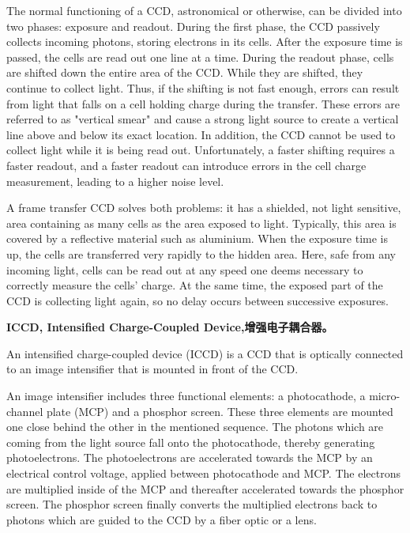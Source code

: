 The normal functioning of a CCD, astronomical or otherwise, can be divided into two phases: exposure and readout. During the first phase, the CCD passively collects incoming photons, storing electrons in its cells. After the exposure time is passed, the cells are read out one line at a time. During the readout phase, cells are shifted down the entire area of the CCD. While they are shifted, they continue to collect light. Thus, if the shifting is not fast enough, errors can result from light that falls on a cell holding charge during the transfer. These errors are referred to as "vertical smear" and cause a strong light source to create a vertical line above and below its exact location. In addition, the CCD cannot be used to collect light while it is being read out. Unfortunately, a faster shifting requires a faster readout, and a faster readout can introduce errors in the cell charge measurement, leading to a higher noise level.

A frame transfer CCD solves both problems: it has a shielded, not light sensitive, area containing as many cells as the area exposed to light. Typically, this area is covered by a reflective material such as aluminium. When the exposure time is up, the cells are transferred very rapidly to the hidden area. Here, safe from any incoming light, cells can be read out at any speed one deems necessary to correctly measure the cells' charge. At the same time, the exposed part of the CCD is collecting light again, so no delay occurs between successive exposures.

\textbf{ICCD, Intensified Charge-Coupled Device,增强电子耦合器。}

An intensified charge-coupled device (ICCD) is a CCD that is optically connected to an image intensifier that is mounted in front of the CCD.

An image intensifier includes three functional elements: a photocathode, a micro-channel plate (MCP) and a phosphor screen. These three elements are mounted one close behind the other in the mentioned sequence. The photons which are coming from the light source fall onto the photocathode, thereby generating photoelectrons. The photoelectrons are accelerated towards the MCP by an electrical control voltage, applied between photocathode and MCP. The electrons are multiplied inside of the MCP and thereafter accelerated towards the phosphor screen. The phosphor screen finally converts the multiplied electrons back to photons which are guided to the CCD by a fiber optic or a lens.

